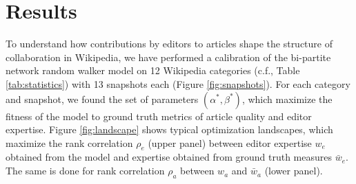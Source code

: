 \section{Results}
To understand how contributions by editors to articles shape the structure of collaboration in Wikipedia, we have performed a calibration of the bi-partite network random walker model on 12 Wikipedia categories (c.f., Table \ref{tab:statistics}) with 13 snapshots each (Figure \ref{fig:snapshots}). For each category and snapshot, we found the set of parameters $(\alpha^*,\beta^*)$, which maximize the fitness of the model to ground truth metrics of article quality and editor expertise. Figure \ref{fig:landscape} shows typical optimization landscapes, which maximize the rank correlation $\rho_e$ (upper panel) between editor expertise $w_{e}$ obtained from the model and expertise obtained from ground truth measures $\bar{w}_e$. The same is done for rank correlation $\rho_a$ between $w_a$ and $\bar{w}_a$ (lower panel). 

